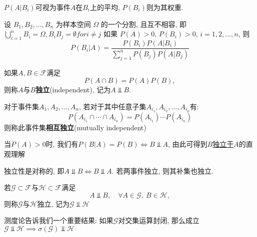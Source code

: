 \begin{note}
    $P(A | B_i)$可视为事件$A$在$B_i$上的平均, $P(B_i)$则为其权重.
\end{note}

\begin{theorem}[Bayes定理]
    设 $B_1, B_2, \dotsc, B_n$ 为样本空间 $\Omega$ 的一个分割, 且互不相容, 即$\bigcup _{i=1} ^n B_i = \Omega, B_i B_j= \emptyset for i \neq j $
    如果 $P(A) > 0$, $P(B_i) > 0$, $i = 1,2, \dotsc, n$,
    则
    \begin{equation}
        P (B_i | A) = \frac{P(B_i) P(A|B_i)}{\sum_{j=1}^n P(B_j) P(A|B_j)}
    \end{equation}
\end{theorem}

\begin{definition}[事件的独立性]
    如果$A,B\in\mathscr{F}$满足
    \[ P(A\cap B) = P(A)P(B), \]
    则称$A$与$B$\textbf{独立}(independent), 记为$A \Vbar B$.

    对于事件集$A_1, A_2, \dotsc, A_n$, 若对于其中任意子集$A_{i_1}, A_{i_2}, \dotsc, A_{i_n}$有:
    \[ P(A_{i_1} \cap \cdots  \cap A_{i_n}) =P(A_{i_1})\cdots P(A_{i_n})  \]
    则称此事件集\textbf{相互独立}(mutually independent)
\end{definition}

\begin{note}
    当$P(A)>0$时, 我们有$ P(B|A) = P(B) \iff B \Vbar A$, 由此可得到\underline{$B$独立于$A$}的直观理解
\end{note}

\begin{property}
    独立性是对称的, 即$A \Vbar B \iff B \Vbar A$. 若两事件独立, 则其补集也独立.
    \begin{center}
    \end{center}
\end{property}

\begin{definition}[事件域的独立性]
    若$\mathscr{G} \subset \mathscr{F}$与$\mathscr{H} \subset \mathscr{F}$满足
    \[ A \Vbar B, \quad \forall A\in\mathscr{G},\ B\in\mathscr{H}, \]
    则称$\mathscr{G}$与$\mathscr{H}$独立, 记为$\mathscr{G} \Vbar \mathscr{H}$
\end{definition}

测度论告诉我们一个重要结果: 如果$\mathscr{G}$对交集运算封闭, 那么成立$\mathscr{G}\Vbar\mathscr{H} \implies \sigma(\mathscr{G}) \Vbar \mathscr{H}$
